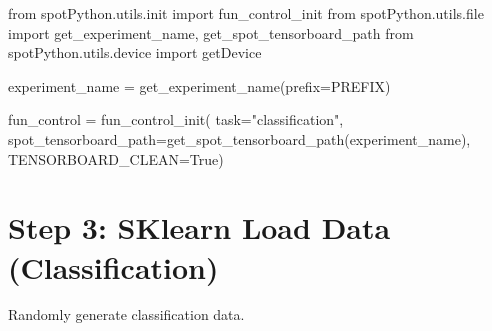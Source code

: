 \documentclass[
  letterpaper,
  DIV=11,
  numbers=noendperiod]{scrreprt}
\newenvironment{Shaded}{\begin{snugshade}}{\end{snugshade}}
\newcommand{\BuiltInTok}[1]{\textcolor[rgb]{0.00,0.23,0.31}{#1}}
\newcommand{\ImportTok}[1]{\textcolor[rgb]{0.00,0.46,0.62}{#1}}
\newcommand{\NormalTok}[1]{\textcolor[rgb]{0.00,0.23,0.31}{#1}}
\newcommand{\OperatorTok}[1]{\textcolor[rgb]{0.37,0.37,0.37}{#1}}
\newcommand{\StringTok}[1]{\textcolor[rgb]{0.13,0.47,0.30}{#1}}
\newcommand{\VariableTok}[1]{\textcolor[rgb]{0.07,0.07,0.07}{#1}}
\begin{document}
\begin{Shaded}
\begin{Highlighting}[]
\ImportTok{from}\NormalTok{ spotPython.utils.init }\ImportTok{import}\NormalTok{ fun\_control\_init}
\ImportTok{from}\NormalTok{ spotPython.utils.}\BuiltInTok{file} \ImportTok{import}\NormalTok{ get\_experiment\_name, get\_spot\_tensorboard\_path}
\ImportTok{from}\NormalTok{ spotPython.utils.device }\ImportTok{import}\NormalTok{ getDevice}

\NormalTok{experiment\_name }\OperatorTok{=}\NormalTok{ get\_experiment\_name(prefix}\OperatorTok{=}\NormalTok{PREFIX)}

\NormalTok{fun\_control }\OperatorTok{=}\NormalTok{ fun\_control\_init(}
\NormalTok{    task}\OperatorTok{=}\StringTok{"classification"}\NormalTok{,}
\NormalTok{    spot\_tensorboard\_path}\OperatorTok{=}\NormalTok{get\_spot\_tensorboard\_path(experiment\_name),}
\NormalTok{    TENSORBOARD\_CLEAN}\OperatorTok{=}\VariableTok{True}\NormalTok{)}
\end{Highlighting}
\end{Shaded}

\hypertarget{sec-data-loading-10}{%
\section{Step 3: SKlearn Load Data
(Classification)}\label{sec-data-loading-10}}

Randomly generate classification data.
\end{document}

